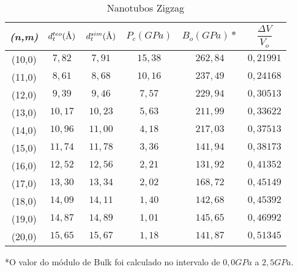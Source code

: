 \documentclass[12pt,a4paper]{article}
\author{Antonio Lívio}
\newcommand{\angstrom}{\textup{\AA}}
\begin{document}
\begin{table}[h]
\centering
\caption{Nanotubos Zigzag}
\begin{tabular}{|c|c|c|c|c|c|}
\hline
 
\textit{(n,m)} & $d_{t}^{teo}(\angstrom)$ & $d_{t}^{sim}(\angstrom)$ & $P_{c}(GPa)$ & $B_{o}(GPa)*$ & $\dfrac{\Delta V}{V_{o}}$ \\ 
\hline 

(10,0) & $7,82$ & $7,91$ & $15,38$ & $262,84$ & $0,21991$ \\ 
\hline
 
(11,0) & $8,61$ & $8,68$ & $10,16$ & $237,49$ & $0,24168$ \\ 
\hline
 
(12,0) & $9,39$ & $9,46$ & $7,57$ & $229,94$ & $0,30513$ \\ 
\hline
 
(13,0) & $10,17$ & $10,23$ & $5,63$ & $211,99$ & $0,33622$ \\ 
\hline
 
(14,0) & $10,96$ & $11,00$ & $4,18$ & $217,03$ & $0,37513$ \\ 
\hline
 
(15,0) & $11,74$ & $11,78$ & $3,36$ & $141,94$ & $0,38173$ \\ 
\hline
 
(16,0) & $12,52$ & $12,56$ & $2,21$ & $131,92$ & $0,41352$ \\ 
\hline
 
(17,0) & $13,30$ & $13,34$ & $2,02$ & $168,72$ & $0,45149$ \\ 
\hline
 
(18,0) & $14,09$ & $14,11$ & $1,40$ & $142,68$ & $0,45392$ \\ 
\hline

(19,0) & $14,87$ & $14,89$ & $1,01$ & $145,65$ & $0,46992$ \\ 
\hline

(20,0) & $15,65$ & $15,67$ & $1,18$ & $141,87$ & $0,51345$ \\ 
\hline



 
 
  
 
\end{tabular} 
\end{table}
\begin{small}
*O valor do módulo de Bulk foi calculado no intervalo de $0,0GPa$ a $2,5GPa$.
\end{small}
\end{document}
